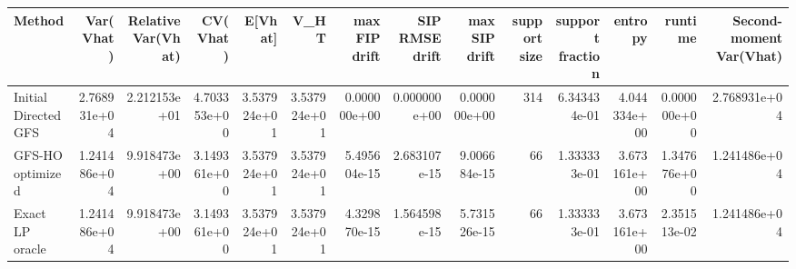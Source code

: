 \begin{tabular}{lrrrrrrrrrrrrr}
\toprule
Method & Var(Vhat) & Relative Var(Vhat) & CV(Vhat) & E[Vhat] & V_HT & max FIP drift & SIP RMSE drift & max SIP drift & support size & support fraction & entropy & runtime & Second-moment Var(Vhat) \\
\midrule
Initial Directed GFS & 2.768931e+04 & 2.212153e+01 & 4.703353e+00 & 3.537924e+01 & 3.537924e+01 & 0.000000e+00 & 0.000000e+00 & 0.000000e+00 & 314 & 6.343434e-01 & 4.044334e+00 & 0.000000e+00 & 2.768931e+04 \\
GFS-HO optimized & 1.241486e+04 & 9.918473e+00 & 3.149361e+00 & 3.537924e+01 & 3.537924e+01 & 5.495604e-15 & 2.683107e-15 & 9.006684e-15 & 66 & 1.333333e-01 & 3.673161e+00 & 1.347676e+00 & 1.241486e+04 \\
Exact LP oracle & 1.241486e+04 & 9.918473e+00 & 3.149361e+00 & 3.537924e+01 & 3.537924e+01 & 4.329870e-15 & 1.564598e-15 & 5.731526e-15 & 66 & 1.333333e-01 & 3.673161e+00 & 2.351513e-02 & 1.241486e+04 \\
\bottomrule
\end{tabular}

